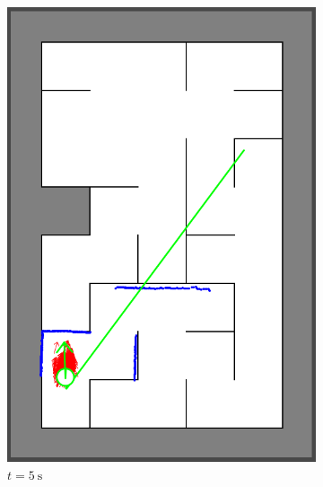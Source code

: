 \subsubsection{}
\begin{figure}[H]
     \centering
     \begin{subfigure}{0.2\textwidth}
         \centering
         \includegraphics[width=\textwidth]{figures/localization2_5s.png}
         \caption{$t = \SI{5}{\second}$}
         \label{mapping2s}
     \end{subfigure}
     \hspace{1em}
     \begin{subfigure}{0.2\textwidth}
         \centering

\end{subfigure}
\end{figure}
